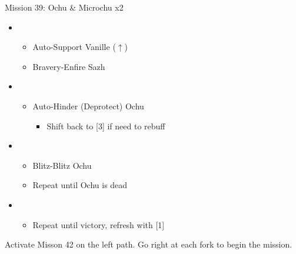 \begin{battle}{Mission 39: Ochu \& Microchu x2}
	\begin{itemize}
		\item \third
			\begin{itemize}
				\item Auto-Support Vanille ($\uparrow$)
				\item Bravery-Enfire Sazh
			\end{itemize}
		\item \fifth
			\begin{itemize}
				\item Auto-Hinder (Deprotect) Ochu
					\begin{itemize}
						\item Shift back to [3] if need to rebuff
					\end{itemize}
			\end{itemize}
		\item \first
			\begin{itemize}
				\item Blitz-Blitz Ochu
				\item Repeat until Ochu is dead
			\end{itemize}
		\item \second
			\begin{itemize}
				\item Repeat until victory, refresh with [1]
			\end{itemize}												
	\end{itemize}
\end{battle}

Activate Misson 42 on the left path.
Go right at each fork to begin the mission.

